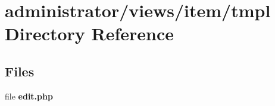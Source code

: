 \section{administrator/views/item/tmpl Directory Reference}
\label{dir_c26e4a002129f37343b7bd2ab39579ce}
\subsection*{Files}
\begin{DoxyCompactItemize}
\item 
file \textbf{ edit.\+php}
\end{DoxyCompactItemize}
